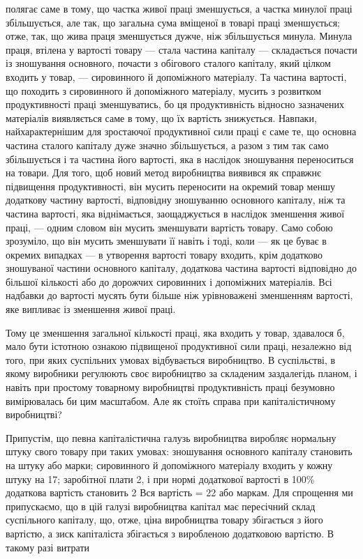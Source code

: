 \parcont{}  %
полягає саме в тому, що частка живої праці зменшується,
а частка минулої праці збільшується, але так, що загальна сума
вміщеної в товарі праці зменшується; отже, так, що жива праця
зменшується дужче, ніж збільшується минула. Минула праця,
втілена у вартості товару — стала частина капіталу — складається
почасти із зношування основного, почасти з обігового
сталого капіталу, який цілком входить у товар, — сировинного
й допоміжного матеріалу. Та частина вартості, що походить
з сировинного й допоміжного матеріалу, мусить з розвитком
продуктивності праці зменшуватись, бо ця продуктивність відносно
зазначених матеріалів виявляється саме в тому, що їх вартість
знижується. Навпаки, найхарактернішим для зростаючої
продуктивної сили праці є саме те, що основна частина сталого
капіталу дуже значно збільшується, а разом з тим так само
збільшується і та частина його вартості, яка в наслідок зношування
переноситься на товари. Для того, щоб новий метод
виробництва виявився як справжнє підвищення продуктивності,
він мусить переносити на окремий товар меншу додаткову частину
вартості, відповідну зношуванню основного капіталу,
ніж та частина вартості, яка віднімається, заощаджується в наслідок
зменшення живої праці, — одним словом він мусить зменшувати
вартість товару. Само собою зрозуміло, що він мусить
зменшувати її навіть і тоді, коли — як це буває в окремих випадках
— в утворення вартості товару входить, крім додатково зношуваної
частини основного капіталу, додаткова частина вартості
відповідно до більшої кількості або до дорожчих сировинних і
допоміжних матеріалів. Всі надбавки до вартості мусять бути
більше ніж урівноважені зменшенням вартості, яке випливає із
зменшення живої праці.

Тому це зменшення загальної кількості праці, яка входить
у товар, здавалося б, мало бути істотною ознакою підвищеної
продуктивної сили праці, незалежно від того, при яких суспільних
умовах відбувається виробництво. В суспільстві, в якому
виробники регулюють своє виробництво за складеним заздалегідь
планом, і навіть при простому товарному виробництві продуктивність
праці безумовно вимірювалась би цим масштабом.
Але як стоїть справа при капіталістичному виробництві?

Припустім, що певна капіталістична галузь виробництва
виробляє нормальну штуку свого товару при таких умовах: зношування
основного капіталу становить на штуку  або
марки; сировинного й допоміжного матеріалу входить у кожну
штуку на 17; заробітної плати 2, і при нормі
додаткової вартості в 100\% додаткова вартість становить 2
Вся вартість = 22 або маркам. Для спрощення
ми припускаємо, що в цій галузі виробництва капітал має пересічний
склад суспільного капіталу, що, отже, ціна виробництва
товару збігається з його вартістю, а зиск капіталіста збігається
з виробленою додатковою вартістю. В такому разі витрати
\parbreak{}  %
